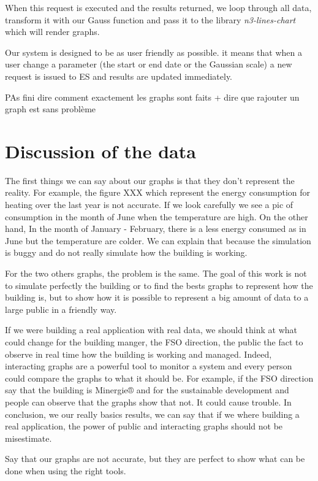 \documentclass{acm_proc_article-sp}
\begin{document}
When this request is executed and the results returned, we loop through all data, transform it with our Gauss function and pass it to the library \emph{n3-lines-chart} which will render graphs.

Our system is designed to be as user friendly as possible. it means that when a user change a parameter (the start or end date or the Gaussian scale) a new request is issued to ES and results are updated immediately. 

PAs fini dire comment exactement les graphs sont faits + dire que rajouter un graph est sans problème

\section{Discussion of the data}
\label{discuss}
The first things we can say about our graphs is that they don’t represent the reality. For example, the figure XXX which represent the energy consumption for heating over the last year is not accurate. If we look carefully we see a pic of consumption in the month of June when the temperature are high. On the other hand, In the month of January - February, there is a less energy consumed as in June but the temperature are colder. We can explain that because the simulation is buggy and do not really simulate how the building is working.

For the two others graphs, the problem is the same. The goal of this work is not to simulate perfectly the building or to find the bests graphs to represent how the building is, but to show how it is possible to represent a big amount of data to a large public in a friendly way.

If we were building a real application with real data, we should think at what could change for the building manger, the FSO direction, the public the fact to observe in real time how the building is working and managed. Indeed, interacting graphs are a powerful tool to monitor a system and every person could compare the graphs to what it should be. For example, if the FSO direction say that the building is Minergie® and for the sustainable development and people can observe that the graphs show that not. It could cause trouble. In conclusion, we our really basics results, we can say that if we where building a real application, the power of public and interacting graphs should not be misestimate.

Say that our graphs are not accurate, but they are perfect to show what can be done when using the right tools.
\end{document}
